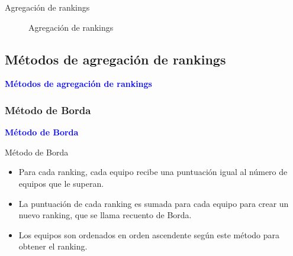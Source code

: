 \documentclass[10pt]{beamer}
\begin{document}
	\begin{frame}{Agregación de rankings}
		\begin{figure}
			\centering
			\agregacionrankings
			\caption{Agregación de rankings}
			\label{fig:agregación_rankings}
		\end{figure}
	\end{frame}
	
	\subsection{Métodos de agregación de rankings}
	
	\begin{frame}
		\begin{center}
			\Huge\textbf{\textsf{\textcolor{blue}{Métodos de agregación de rankings}}}
		\end{center}
	\end{frame}
	
	\subsubsection{Método de Borda}
	
	\begin{frame}
		\begin{center}
			\Huge\textbf{\textsf{\textcolor{blue}{Método de Borda}}}
		\end{center}
	\end{frame}
	
	\begin{frame}{Método de Borda}
		
		\begin{itemize}
			\item Para cada ranking, cada equipo recibe una puntuación igual al número de equipos que le superan.
			
			\item La puntuación de cada ranking es sumada para cada equipo para crear un nuevo ranking, que se llama recuento de Borda.
			
			\item Los equipos son ordenados en orden ascendente según este método para obtener el ranking.
		\end{itemize}
		
	\end{frame}
	
\end{document}
